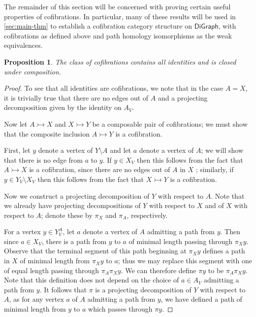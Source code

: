 \documentclass[11pt]{article}
\newtheorem{proposition}[theo]{Proposition}
\theoremstyle{definition}
\numberwithin{equation}{section}
\newcommand{\DiGraph}{\mathsf{DiGraph}}
\newcommand{\cto}{\rightarrowtail}
\begin{document}
The remainder of this section will be concerned with proving certain useful properties of cofibrations.
In particular, many of these results will be used in \cref{sec:main-thm} to establish a cofibration category structure on $\DiGraph$, with cofibrations as defined above and path homology isomorphisms as the weak equivalences.

\begin{proposition}\label{cof-wide-subcat}
The class of cofibrations contains all identities and is closed under composition.
\end{proposition}

\begin{proof}
To see that all identities are cofibrations, we note that in the case $A = X$, it is trivially true that there are no edges out of $A$ and a projecting decomposition given by the identity on $A_V$.

Now let $A \cto X$ and $X \cto Y$ be a composable pair of cofibrations; we must show that the composite inclusion $A \cto Y$ is a cofibration. 

First, let $y$ denote a vertex of $Y \setminus A$ and let $a$ denote a vertex of $A$; we will show that there is no edge from $a$ to $y$. If $y \in X_V$ then this follows from the fact that $A \cto X$ is a cofibration, since there are no edges out of $A$ in $X$
; similarly, if $y \in Y_V\setminus X_V$ then this follows from the fact that $X \cto Y$ is a cofibration. 

Now we construct a projecting decomposition of $Y$ with respect to $A$. Note that we already have projecting decompositions of $Y$ with respect to $X$ and of $X$ with respect to $A$; denote these by $\pi_X$ and $\pi_A$, respectively.

For a vertex $y \in Y_V^A$, let $a$ denote a vertex of $A$ admitting a path from $y$.
Then since $a \in X_V$, there is a path from $y$ to $a$ of minimal length passing through $\pi_X y$.
Observe that the terminal segment of this path beginning at $\pi_X y$ defines a path in $X$ of minimal length from $\pi_X y$ to $a$; thus we may replace this segment with one of equal length passing through $\pi_A \pi_X y$.
We can therefore define $\pi y$ to be $\pi_A \pi_X y$.
Note that this definition does not depend on the choice of $a \in A_V$ admitting a path from $y$.
It follows that $\pi$ is a projecting decomposition of $Y$ with respect to $A$, as for any vertex $a$ of $A$ admitting a path from $y$, we have defined a path of minimal length from $y$ to $a$ which passes through $\pi y$.
\end{proof}
\end{document}
